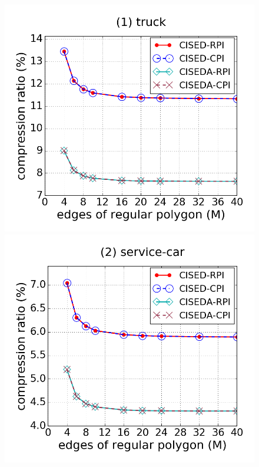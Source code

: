 \begin{figure}[tb!]
\centering
\includegraphics[scale = 0.250]{figures/Exp-M-e-200-CR-truck.png}
\includegraphics[scale = 0.250]{figures/Exp-M-e-200-CR-service.png}

\end{figure}
